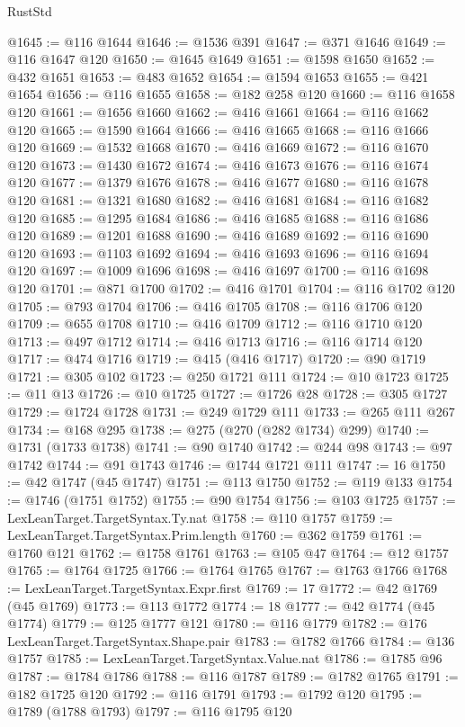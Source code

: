 \begin{lexlean}{RustStd}
\begin{coremodule}
@1645 := @116 @1644
@1646 := @1536 @391
@1647 := @371 @1646
@1649 := @116 @1647 @120
@1650 := @1645 @1649
@1651 := @1598 @1650
@1652 := @432 @1651
@1653 := @483 @1652
@1654 := @1594 @1653
@1655 := @421 @1654
@1656 := @116 @1655
@1658 := @182 @258 @120
@1660 := @116 @1658 @120
@1661 := @1656 @1660
@1662 := @416 @1661
@1664 := @116 @1662 @120
@1665 := @1590 @1664
@1666 := @416 @1665
@1668 := @116 @1666 @120
@1669 := @1532 @1668
@1670 := @416 @1669
@1672 := @116 @1670 @120
@1673 := @1430 @1672
@1674 := @416 @1673
@1676 := @116 @1674 @120
@1677 := @1379 @1676
@1678 := @416 @1677
@1680 := @116 @1678 @120
@1681 := @1321 @1680
@1682 := @416 @1681
@1684 := @116 @1682 @120
@1685 := @1295 @1684
@1686 := @416 @1685
@1688 := @116 @1686 @120
@1689 := @1201 @1688
@1690 := @416 @1689
@1692 := @116 @1690 @120
@1693 := @1103 @1692
@1694 := @416 @1693
@1696 := @116 @1694 @120
@1697 := @1009 @1696
@1698 := @416 @1697
@1700 := @116 @1698 @120
@1701 := @871 @1700
@1702 := @416 @1701
@1704 := @116 @1702 @120
@1705 := @793 @1704
@1706 := @416 @1705
@1708 := @116 @1706 @120
@1709 := @655 @1708
@1710 := @416 @1709
@1712 := @116 @1710 @120
@1713 := @497 @1712
@1714 := @416 @1713
@1716 := @116 @1714 @120
@1717 := @474 @1716
@1719 := @415 (@416 @1717)
@1720 := @90 @1719
@1721 := @305 @102
@1723 := @250 @1721 @111
@1724 := @10 @1723
@1725 := @11 @13
@1726 := @10 @1725
@1727 := @1726 @28
@1728 := @305 @1727
@1729 := @1724 @1728
@1731 := @249 @1729 @111
@1733 := @265 @111 @267
@1734 := @168 @295
@1738 := @275 (@270 (@282 @1734) @299)
@1740 := @1731 (@1733 @1738)
@1741 := @90 @1740
@1742 := @244 @98
@1743 := @97 @1742
@1744 := @91 @1743
@1746 := @1744 @1721 @111
@1747 := 16
@1750 := @42 @1747 (@45 @1747)
@1751 := @113 @1750
@1752 := @119 @133
@1754 := @1746 (@1751 @1752)
@1755 := @90 @1754
@1756 := @103 @1725
@1757 := LexLeanTarget.TargetSyntax.Ty.nat
@1758 := @110 @1757
@1759 := LexLeanTarget.TargetSyntax.Prim.length
@1760 := @362 @1759
@1761 := @1760 @121
@1762 := @1758 @1761
@1763 := @105 @47
@1764 := @12 @1757
@1765 := @1764 @1725
@1766 := @1764 @1765
@1767 := @1763 @1766
@1768 := LexLeanTarget.TargetSyntax.Expr.first
@1769 := 17
@1772 := @42 @1769 (@45 @1769)
@1773 := @113 @1772
@1774 := 18
@1777 := @42 @1774 (@45 @1774)
@1779 := @125 @1777 @121
@1780 := @116 @1779
@1782 := @176 LexLeanTarget.TargetSyntax.Shape.pair
@1783 := @1782 @1766
@1784 := @136 @1757
@1785 := LexLeanTarget.TargetSyntax.Value.nat
@1786 := @1785 @96
@1787 := @1784 @1786
@1788 := @116 @1787
@1789 := @1782 @1765
@1791 := @182 @1725 @120
@1792 := @116 @1791
@1793 := @1792 @120
@1795 := @1789 (@1788 @1793)
@1797 := @116 @1795 @120

\end{coremodule}
\end{lexlean}
